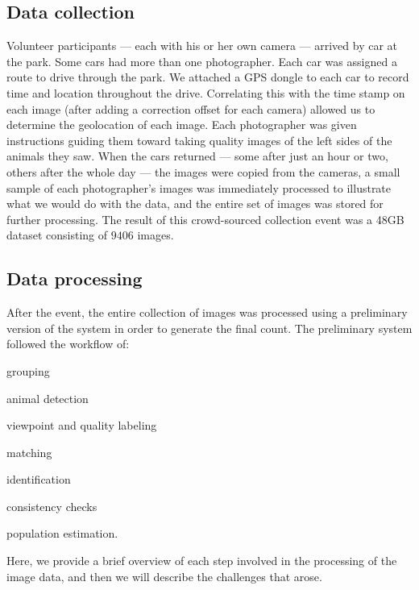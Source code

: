     \subsection{Data collection}
        Volunteer participants --- each with his or her own camera --- arrived by car at the park. Some cars had more
        than one photographer. Each car was assigned a route to drive through the park. We attached a GPS dongle to each
        car to record time and location throughout the drive. Correlating this with the time stamp on each image (after
        adding a correction offset for each camera) allowed us to determine the geolocation of each image. Each
        photographer was given instructions guiding them toward taking quality images of the left sides of the animals
        they saw. When the cars returned --- some after just an hour or two, others after the whole day --- the images
        were copied from the cameras, a small sample of each photographer's images was immediately processed to
        illustrate what we would do with the data, and the entire set of images was stored for further processing. The
        result of this crowd-sourced collection event was a 48GB dataset consisting of $9406$ images.

    \subsection{Data processing}\label{subsec:introdataprocess}

        After the event, the entire collection of images was processed using a preliminary version of the system in
        order to generate the final count. The preliminary system followed the workflow of: %
        \begin{enumin}
            \item \occurrence{} grouping  %
            \item animal detection %
            \item viewpoint and quality labeling  %
            \item \intraoccurrence{} matching %
            \item \vsexemplar{} identification %
            \item consistency checks  %
            \item population estimation.  %
        \end{enumin}
        Here, we provide a brief overview of each step involved in the processing of the \GZC{} image data, and then we
        will describe the challenges that arose.

